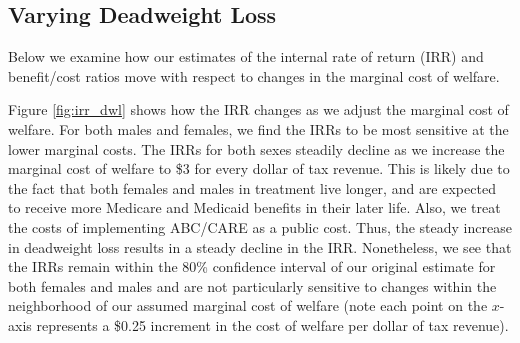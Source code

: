 \subsection{Varying Deadweight Loss}
\label{appendix:varying-dwl}

\noindent Below we examine how our estimates of the internal rate of return (IRR) and benefit/cost
ratios move with respect to changes in the marginal cost of welfare. 

\noindent Figure \ref{fig:irr_dwl} shows how the IRR changes as we adjust
the marginal cost of welfare. For both males and females, we find the IRRs
to be most sensitive at the lower marginal costs. The IRRs for both sexes
steadily decline as we increase the marginal cost of welfare to \$3 for every dollar
of tax revenue. This is likely due
to the fact that both females and males in treatment live longer, and are expected to 
receive more Medicare and Medicaid benefits in their later life. 
Also, we treat the costs of implementing ABC/CARE as a public cost. 
Thus, the steady increase in deadweight loss results in a 
steady decline in the IRR. Nonetheless, we see that the IRRs 
remain within the 80\% confidence interval of our original estimate 
for both females and males and are not particularly sensitive to changes within the 
neighborhood of our assumed marginal cost of welfare (note each point on the $x$-axis
represents a \$0.25 increment in the cost of welfare per dollar of tax revenue). 


